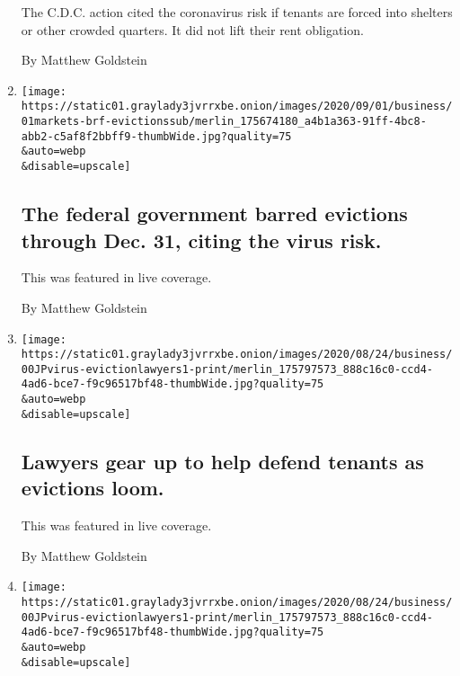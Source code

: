 \begin{enumerate}
  The C.D.C. action cited the coronavirus risk if tenants are forced
  into shelters or other crowded quarters. It did not lift their rent
  obligation.

  By Matthew Goldstein
\item
  \href{/live/2020/09/01/business/stock-market-today-coronavirus/the-federal-government-barred-evictions-through-dec-31-citing-the-virus-risk}{}

  \texttt{[image: https://static01.graylady3jvrrxbe.onion/images/2020/09/01/business/01markets-brf-evictionssub/merlin\_175674180\_a4b1a363-91ff-4bc8-abb2-c5af8f2bbff9-thumbWide.jpg?quality=75\\\&auto=webp\\\&disable=upscale]}

  \hypertarget{the-federal-government-barred-evictions-through-dec-31-citing-the-virus-risk}{%
  \subsection{The federal government barred evictions through Dec. 31,
  citing the virus
  risk.}\label{the-federal-government-barred-evictions-through-dec-31-citing-the-virus-risk}}

  This was featured in live coverage.

  By Matthew Goldstein
\item
  \href{/live/2020/08/24/business/stock-market-today-coronavirus/lawyers-gear-up-to-help-defend-tenants-as-evictions-loom}{}

  \texttt{[image: https://static01.graylady3jvrrxbe.onion/images/2020/08/24/business/00JPvirus-evictionlawyers1-print/merlin\_175797573\_888c16c0-ccd4-4ad6-bce7-f9c96517bf48-thumbWide.jpg?quality=75\\\&auto=webp\\\&disable=upscale]}

  \hypertarget{lawyers-gear-up-to-help-defend-tenants-as-evictions-loom}{%
  \subsection{Lawyers gear up to help defend tenants as evictions
  loom.}\label{lawyers-gear-up-to-help-defend-tenants-as-evictions-loom}}

  This was featured in live coverage.

  By Matthew Goldstein
\item
  \href{/2020/08/24/business/tenants-lawyers-eviction-moratorium.html}{}

  \texttt{[image: https://static01.graylady3jvrrxbe.onion/images/2020/08/24/business/00JPvirus-evictionlawyers1-print/merlin\_175797573\_888c16c0-ccd4-4ad6-bce7-f9c96517bf48-thumbWide.jpg?quality=75\\\&auto=webp\\\&disable=upscale]}


\end{enumerate}
